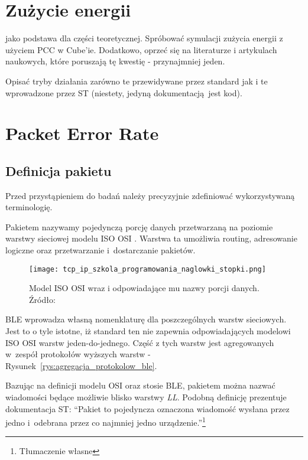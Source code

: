 

\section{Zużycie energii}
\cite{noauthor_um1718_2022} jako podstawa dla części teoretycznej. Spróbować symulacji zużycia energii z użyciem PCC w Cube'ie.
Dodatkowo, oprzeć się na literaturze i artykulach naukowych, które poruszają tę kwestię - przynajmniej jeden.

Opisać tryby działania zarówno te przewidywane przez standard jak i te wprowadzone przez ST (niestety, jedyną dokumentacją jest kod).

\section{Packet Error Rate}
\lipsum[1-3]

\subsection{Definicja pakietu}
Przed przystąpieniem do badań należy precyzyjnie zdefiniować wykorzystywaną terminologię.

Pakietem nazywamy pojedynczą porcję danych przetwarzaną na poziomie warstwy sieciowej modelu ISO OSI \cite{sa_tcpip_nodate}.
Warstwa ta umożliwia routing, adresowanie logiczne oraz przetwarzanie i~dostarczanie pakietów.

\begin{figure}[!ht]
	\centering \texttt{[image: tcp\_ip\_szkola\_programowania\_naglowki\_stopki.png]} 
	\caption{Model ISO OSI wraz i odpowiadające mu nazwy porcji danych. Źródło: \cite{sa_tcpip_nodate}}
	\label{rys:iso_osi_model_nazwy_grup_danych}
\end{figure}

\gls{BLE} wprowadza własną nomenklaturę dla poszczególnych warstw sieciowych. Jest to o tyle istotne, iż standard ten
nie zapewnia odpowiadających modelowi ISO OSI warstw jeden-do-jednego. Część z tych warstw jest agregowanych w~zespół 
protokołów wyższych warstw - Rysunek~\ref{rys:agregacja_protokolow_ble}. 

Bazując na definicji modelu OSI oraz stosie BLE, pakietem można nazwać wiadomości będące możliwie blisko
warstwy \textit{\gls{LL}}. Podobną definicję prezentuje dokumentacja ST:
\enquote{Pakiet to pojedyncza oznaczona wiadomość wysłana przez jedno i~odebrana przez 
co najmniej jedno urządzenie.}\footnote{Tłumaczenie własne}~\cite{stmicroelectronics_pm0271_2021}

